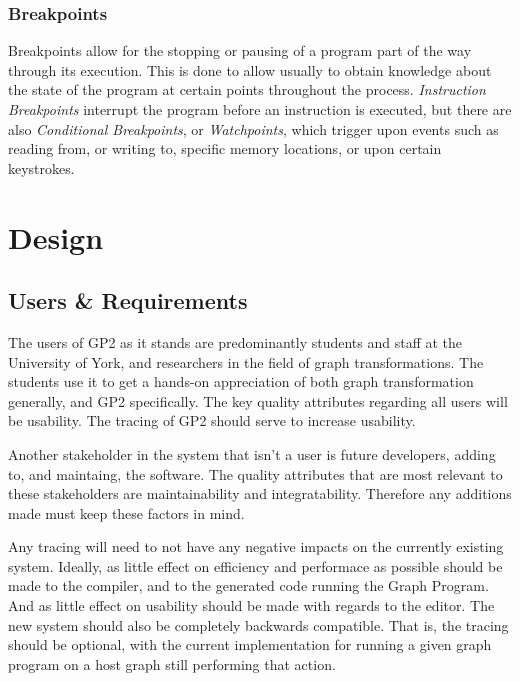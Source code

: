 \documentclass{UoYCSproject}
\begin{document}
\subsection{Breakpoints}
Breakpoints allow for the stopping or pausing of a program part of the way through its execution. This is done to allow usually to obtain knowledge about the state of the program at certain points throughout the process. \emph{Instruction Breakpoints} interrupt the program before an instruction is executed, but there are also \emph{Conditional Breakpoints}, or \emph{Watchpoints}, which trigger upon events such as reading from, or writing to, specific memory locations, or upon certain keystrokes.




\chapter{Design}
\section{Users \& Requirements}

The users of GP2 as it stands are predominantly students and staff at the University of York, and researchers in the field of graph transformations. The students use it to get a hands-on appreciation of both graph transformation generally, and GP2 specifically. The key quality attributes regarding all users will be usability. The tracing of GP2 should serve to increase usability. 

Another stakeholder in the system that isn't a user is future developers, adding to, and maintaing, the software. The quality attributes that are most relevant to these stakeholders are maintainability and integratability. Therefore any additions made must keep these factors in mind.

Any tracing will need to not have any negative impacts on the currently existing system. Ideally, as little effect on efficiency and performace as possible should be made to the compiler, and to the generated code running the Graph Program. And as little effect on usability should be made with regards to the editor. The new system should also be completely backwards compatible. That is, the tracing should be optional, with the current implementation for running a given graph program on a host graph still performing that action.
\end{document}
